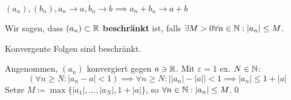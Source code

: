 \documentclass[consecutivenumbering]{gadsescript}
\begin{document}
$ (a_n), (b_n), a_n \to a, b_n \to b \implies a_n + b_n \to a + b $
\begin{subdefinition}
	Wir sagen, dass $ (a_n) \subset \mathbb{R} $ \textbf{beschränkt} ist, falls $ \exists M > 0 \forall n \in \mathbb{N} : | a_n | \leq M $.
\end{subdefinition}
\begin{sublemma}
	Konvergente Folgen sind beschränkt.
	\begin{subproof*}
		Angenommen, $ (a_n) $ konvergiert gegen $ a \ni \mathbb{R} $. Mit $ \varepsilon = 1 $ ex. $N \in \mathbb{N}$:
		\[ ( \forall n \geq N : | a_n - a | < 1 ) \implies \forall n \geq N : \left| |a_n| - |a| \right| < 1 \implies | a_n | \leq 1 + |a| \]
		Setze $ M \coloneqq \max\{|a_1|, \dotsc, |a_N|, 1 + |a|\}$, so $ \forall n \in \mathbb{N} : | a_n | \leq M $.\qed
	\end{subproof*}
\end{sublemma}
\end{document}
